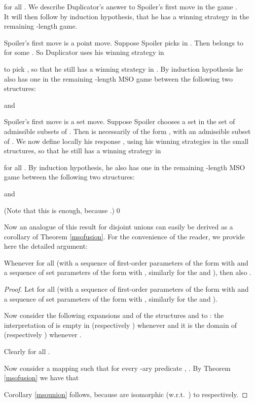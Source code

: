 \documentclass{LMCS}
\newcommand{\mso}{\textsf{MSO}\xspace}
\begin{document}
for all . We describe Duplicator's answer to
Spoiler's first move in the game .\\ It will then follow by induction
hypothesis, that he has a winning strategy in the remaining
-length game.
\begin{iteMize}{}
\item   Spoiler's first move is a point move. Suppose Spoiler
picks  in . Then  belongs to
 for some . So Duplicator uses his
winning strategy in

to pick ,
 so that he still has a winning strategy in .
 By induction hypothesis he also has one
 in the remaining -length \mso game between the following two structures:
 
 
and

\item   Spoiler's first move is a set move. Suppose Spoiler chooses a set
 in the set of admissible subsets of . Then  is necessarily of the form , with  an admissible subset of . We
now define locally his response ,
using his winning strategies in the small structures, so that he still
has a winning strategy in

for all . By induction hypothesis, he also has one
in the remaining -length \mso game between the following two structures:



and
 
(Note that this is enough,
because .)\qed
\end{iteMize}\smallskip

\noindent Now an analogue of this result for disjoint unions can easily be derived as a corollary of Theorem \ref{msofusion}. For the convenience of the reader, we provide here the detailed argument:


\begin{cor}
Whenever  for all  (with  a sequence of first-order
parameters of the form  with
 and  a sequence of set parameters of
the form  with ,
similarly for the  and ), then also
.\label{msounion}
\end{cor}

\begin{proof}
Let  for all  (with  a sequence of first-order
parameters of the form  with
 and  a sequence of set parameters of
the form  with ,
similarly for the  and ).

Now consider the following expansions  and  of the  structures  and  to :
the interpretation of  is empty in  (respectively ) whenever  and it is the domain of  (respectively ) whenever .

Clearly  for all .

Now consider a mapping  such that for every -ary predicate , . By Theorem \ref{msofusion} we have that 

Corollary \ref{msounion} follows, because  are isomorphic (w.r.t.~) to  respectively.
\end{proof}
\end{document}
